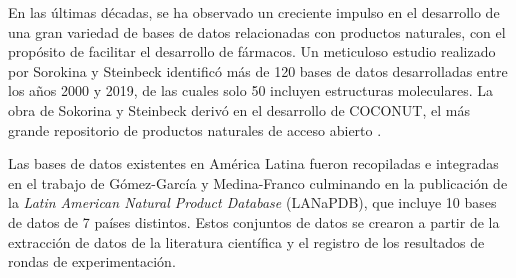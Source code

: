     En las últimas décadas, se ha observado un creciente impulso en el desarrollo de una gran variedad de bases de datos relacionadas con productos naturales, con el propósito
    de facilitar el desarrollo de fármacos. Un meticuloso estudio realizado por Sorokina y Steinbeck \cite{sorokina2020review} identificó más de 120 bases de datos
    desarrolladas entre los años 2000 y 2019, de las cuales solo 50 incluyen estructuras moleculares. La obra de Sokorina y Steinbeck derivó en el desarrollo de COCONUT, 
    el más grande repositorio de productos naturales de acceso abierto \cite{sorokina2021coconut}. 

    Las bases de datos existentes en América Latina fueron recopiladas e integradas en el trabajo de Gómez-García y Medina-Franco \cite{gomez2022progress,gomez2023navigating} culminando
    en la publicación de la \textit{Latin American Natural Product Database} (LANaPDB), que incluye 10 bases de datos de 7 países distintos. Estos conjuntos de datos
    se crearon a partir de la extracción de datos de la literatura científica y el registro de los resultados de rondas de experimentación.


